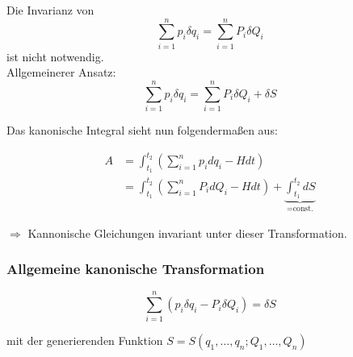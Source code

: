 \begin{frame}
    Die Invarianz von    
    \begin{displaymath}
            \sum_{i=1}^n p_i \delta q_i = \sum_{i=1}^n P_i \delta Q_i
    \end{displaymath}
    ist nicht notwendig. \\
    
    Allgemeinerer Ansatz:
    \begin{displaymath}
    \sum_{i=1}^n p_i \delta q_i = \sum_{i=1}^n P_i \delta Q_i + \delta S
    \end{displaymath}

\end{frame}

\begin{frame}

    Das kanonische Integral sieht nun folgendermaßen aus:
    
    \begin{align*}
    A &= \int_{t_1}^{t_2} \left( \sum_{i=1}^n p_i dq_i - H dt \right) \\
      &= \int_{t_1}^{t_2} \left( \sum_{i=1}^n P_i dQ_i - H dt \right)  +  \underbrace{\int_{t_1}^{t_2} dS}_{=\text{const.}}
    \end{align*}
    
    $\Longrightarrow$  Kannonische Gleichungen invariant unter dieser Transformation.
    
\end{frame}

\begin{frame}
    \frametitle{Allgemeine kanonische Transformation}
    
    
    \begin{displaymath}
        \sum_{i=1}^{n} (p_i \delta q_i - P_i \delta Q_i) = \delta S
    \end{displaymath}
    
    \begin{center} mit der generierenden Funktion $S = S(q_1,\ldots,q_n;Q_1,\ldots,Q_n)$ \end{center}
    
\end{frame}